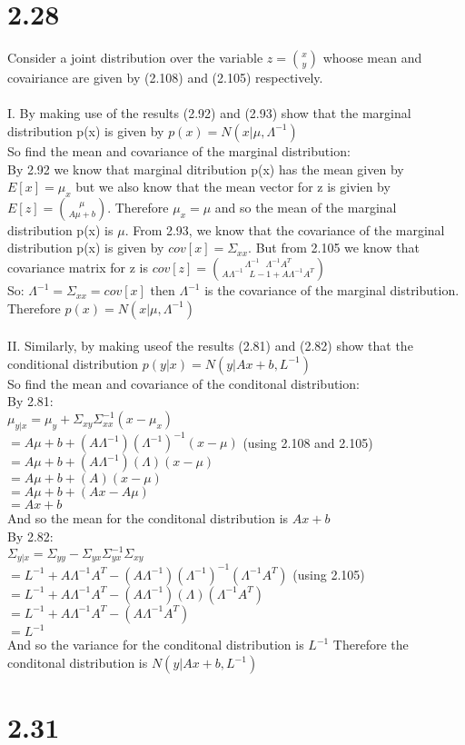 \documentclass[11pt,leqno,fleqn]{article}
\begin{document}
\section{2.28}
Consider a joint distribution over the variable $z =  \binom {x} {y}$ whoose mean and covairiance are given by (2.108) and (2.105) respectively.  
\\
\\
I. By making use of the results (2.92) and (2.93) show that the marginal distribution p(x) is given by  $p(x) = N(x| \mu , \Lambda ^{-1})$\\
 So find the mean and covariance of the marginal distribution:\\
By 2.92 we know that marginal  ditribution p(x) has the mean given by $E[x] = \mu_x$  but we also know that the mean vector for z is givien by $E[z] = \binom{\mu}{A \mu + b}$. Therefore $ \mu_x = \mu $ and so the mean of the marginal distribution p(x) is $\mu$.  From 2.93, we know that the covariance of the marginal distribution p(x) is given by $cov[x] = \Sigma_{xx}$. But from 2.105 we know that covariance matrix for z is
$cov[z] =  \binom {\Lambda^{-1} \ \ \    \Lambda^{-1}A^T} {A \Lambda^{-1} \ \ \ L-1 + A \Lambda^{-1} A^T}$\\
So: $ \Lambda^{-1} = \Sigma_{xx} = cov[x] $ then $\Lambda^{-1}$ is the covariance of the marginal distribution. Therefore $p(x) = N(x| \mu , \Lambda^{-1})$\\
\\
 II. Similarly, by making useof the results (2.81) and (2.82) show that the conditional distribution $p(y|x) = N(y| Ax+b, L^{-1})$\\
 So find the mean and covariance of the conditonal distribution:\\
By 2.81:\\
 $\mu_{y|x} = \mu_y + \Sigma_{xy} \Sigma_{xx}^{-1} (x - \mu_x)$\\
$ = A \mu + b + (A \Lambda^{-1})(\Lambda^{-1})^{-1}(x - \mu)  $ (using 2.108 and 2.105)\\
$ = A \mu + b + (A \Lambda^{-1})(\Lambda)(x - \mu)  $\\
$ = A \mu + b + (A )(x - \mu)  $\\
$ = A \mu + b + (Ax - A\mu)  $\\
$ =  Ax + b $\\
And so the mean for the conditonal distribution is $Ax + b$\\

By 2.82:\\
$\Sigma_{y|x} = \Sigma_{yy} - \Sigma_{yx} \Sigma_{yx}^{-1} \Sigma_{xy}$\\
$= L^{-1} + A \Lambda^{-1} A^{T} - (A \Lambda^{-1})(\Lambda^{-1})^{-1}(\Lambda^{-1} A^T)$ (using 2.105)\\
$= L^{-1} + A \Lambda^{-1} A^{T} - (A \Lambda^{-1})(\Lambda)(\Lambda^{-1} A^T)$\\
$= L^{-1} + A \Lambda^{-1} A^{T} - (A \Lambda^{-1} A^T)$\\
$= L^{-1}$\\
And so the variance for the conditonal distribution is $L^{-1}$ Therefore the conditonal distribution is $N(y| Ax+b, L^{-1})$

\section{2.31}
\end{document}
